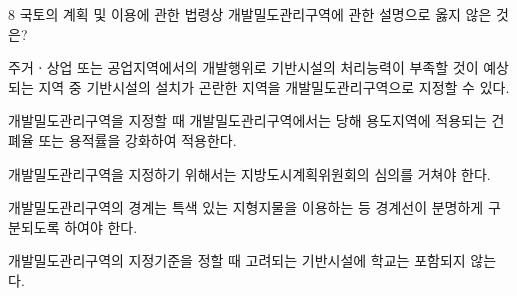 \begin{question}{8}
국토의 계획 및 이용에 관한 법령상 개발밀도관리구역에 관한 설명으로 옳지 않은 것은?
\begin{choices}
  \item 주거ㆍ상업 또는 공업지역에서의 개발행위로 기반시설의 처리능력이 부족할 것이 예상되는 지역 중 기반시설의 설치가 곤란한 지역을 개발밀도관리구역으로 지정할 수 있다.
  \item 개발밀도관리구역을 지정할 때 개발밀도관리구역에서는 당해 용도지역에 적용되는 건폐율 또는 용적률을 강화하여 적용한다.
  \item 개발밀도관리구역을 지정하기 위해서는 지방도시계획위원회의 심의를 거쳐야 한다.
  \item 개발밀도관리구역의 경계는 특색 있는 지형지물을 이용하는 등 경계선이 분명하게 구분되도록 하여야 한다.
  \item 개발밀도관리구역의 지정기준을 정할 때 고려되는 기반시설에 학교는 포함되지 않는다.
\end{choices}
\end{question}
